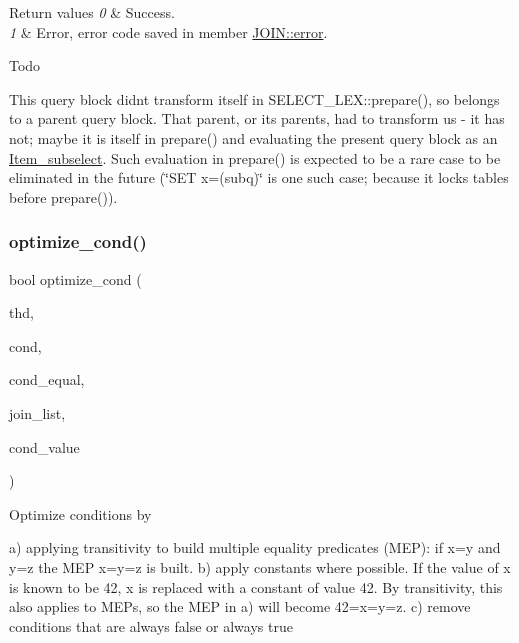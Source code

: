 \begin{DoxyRetVals}{Return values}
{\em 0} & Success. \\
\hline
{\em 1} & Error, error code saved in member \mbox{\hyperlink{classJOIN_a3af313be65a65eb809cb2f11e6e84b0b}{J\+O\+I\+N\+::error}}. \\
\hline
\end{DoxyRetVals}
\begin{DoxyRefDesc}{Todo}
\item[\mbox{\hyperlink{todo__todo000091}{Todo}}]This query block didn\textquotesingle{}t transform itself in S\+E\+L\+E\+C\+T\+\_\+\+L\+E\+X\+::prepare(), so belongs to a parent query block. That parent, or its parents, had to transform us -\/ it has not; maybe it is itself in prepare() and evaluating the present query block as an \mbox{\hyperlink{classItem__subselect}{Item\+\_\+subselect}}. Such evaluation in prepare() is expected to be a rare case to be eliminated in the future (\char`\"{}\+S\+E\+T x=(subq)\char`\"{} is one such case; because it locks tables before prepare()). \end{DoxyRefDesc}
\mbox{\label{group__Query__Optimizer_ga768e4d9b55252e39161f392f34cb5abc}} 
\subsubsection{\texorpdfstring{optimize\+\_\+cond()}{optimize\_cond()}}
{\footnotesize\ttfamily bool optimize\+\_\+cond (\begin{DoxyParamCaption}\item[{T\+HD $\ast$}]{thd,  }\item[{\mbox{\hyperlink{classItem}{Item}} $\ast$$\ast$}]{cond,  }\item[{C\+O\+N\+D\+\_\+\+E\+Q\+U\+AL $\ast$$\ast$}]{cond\+\_\+equal,  }\item[{\mbox{\hyperlink{classList}{List}}$<$ \mbox{\hyperlink{structTABLE__LIST}{T\+A\+B\+L\+E\+\_\+\+L\+I\+ST}} $>$ $\ast$}]{join\+\_\+list,  }\item[{Item\+::cond\+\_\+result $\ast$}]{cond\+\_\+value }\end{DoxyParamCaption})}

Optimize conditions by

a) applying transitivity to build multiple equality predicates (M\+EP)\+: if x=y and y=z the M\+EP x=y=z is built. b) apply constants where possible. If the value of x is known to be 42, x is replaced with a constant of value 42. By transitivity, this also applies to M\+E\+Ps, so the M\+EP in a) will become 42=x=y=z. c) remove conditions that are always false or always true


